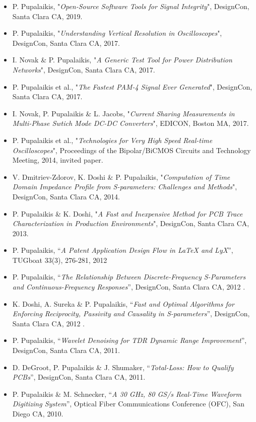 \documentclass[10pt,letterpaper]{extarticle}
\newenvironment{indentsection}[1]%
{\begin{list}{}%
	{\setlength{\leftmargin}{#1}}%
	\item[]%
}
{\end{list}}
\begin{document}
\begin{indentsection}{-1em}\begin{itemize}
\parskip=-0.2em
\item P. Pupalaikis, "\emph{Open-Source Software Tools for Signal Integrity}", DesignCon, Santa Clara CA, 2019.
\item P. Pupalaikis, "\emph{Understanding Vertical Resolution in Oscilloscopes}", DesignCon, Santa Clara CA, 2017.
\item I. Novak \& P. Pupalaikis, "\emph{A Generic Test Tool for Power Distribution Networks}", DesignCon, Santa Clara CA, 2017.
\item P. Pupalaikis et al., "\emph{The Fastest PAM-4 Signal Ever Generated}", DesignCon, Santa Clara CA, 2017.
\item I. Novak, P. Pupalaikis \& L. Jacobs, "\emph{Current Sharing Measurements in Multi-Phase Swtich Mode DC-DC Converters}", EDICON, Boston MA, 2017. 
\item P. Pupalaikis et al., "\emph{Technologies for Very High Speed Real-time Oscilloscopes}", Proceedings of the Bipolar/BiCMOS Circuits and Technology Meeting, 2014, invited paper.
\item  V. Dmitriev-Zdorov, K. Doshi \& P. Pupalaikis, "\emph{Computation of Time Domain Impedance Profile from S-parameters: Challenges and Methods}", DesignCon, Santa Clara CA, 2014.
\item P. Pupalaikis \& K. Doshi, "\emph{A Fast and Inexpensive Method for PCB Trace Characterization in Production Environments}", DesignCon, Santa Clara CA, 2013.
\item P. Pupalaikis, “\emph{A Patent Application Design Flow in LaTeX and LyX}”, TUGboat 33(3), 276-281, 2012
\item P. Pupalaikis, “\emph{The Relationship Between Discrete-Frequency S-Parameters and Continuous-Frequency Responses}”, DesignCon, Santa Clara CA, 2012 .
\item K. Doshi, A. Sureka \& P. Pupalaikis, “\emph{Fast and Optimal Algorithms for Enforcing Reciprocity, Passivity and Causality in S-parameters}”, DesignCon, Santa Clara CA, 2012 .
\item P. Pupalaikis, “\emph{Wavelet Denoising for TDR Dynamic Range Improvement}”, DesignCon, Santa Clara CA, 2011.
\item D. DeGroot, P. Pupalaikis \& J. Shumaker, “\emph{Total-Loss: How to Qualify PCBs}”, DesignCon, Santa Clara CA, 2011. 
\item P. Pupalaikis \& M. Schnecker, “\emph{A 30 GHz, 80 GS/s Real-Time Waveform Digitizing System}”, Optical Fiber Communications Conference (OFC), San Diego CA, 2010. 

\end{itemize}
\end{indentsection}
\end{document}
